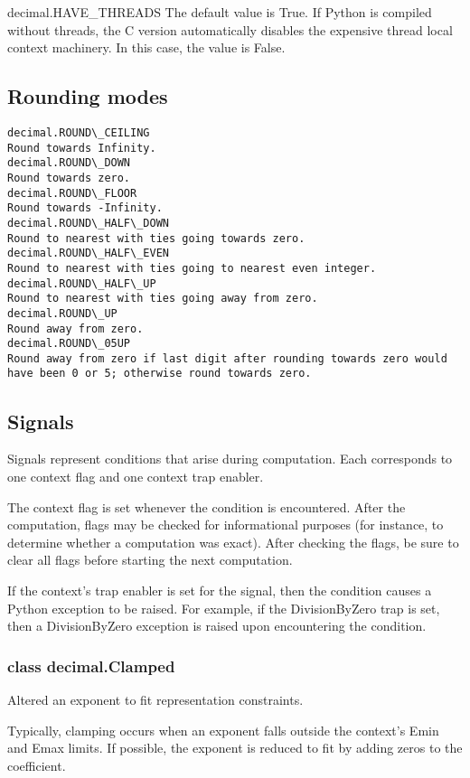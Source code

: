 decimal.HAVE\_THREADS
The default value is True. If Python is compiled without threads, the C version automatically disables the expensive thread local context machinery. In this case, the value is False.

\subsection{Rounding modes}

\begin{lstlisting}
decimal.ROUND\_CEILING
Round towards Infinity.
decimal.ROUND\_DOWN
Round towards zero.
decimal.ROUND\_FLOOR
Round towards -Infinity.
decimal.ROUND\_HALF\_DOWN
Round to nearest with ties going towards zero.
decimal.ROUND\_HALF\_EVEN
Round to nearest with ties going to nearest even integer.
decimal.ROUND\_HALF\_UP
Round to nearest with ties going away from zero.
decimal.ROUND\_UP
Round away from zero.
decimal.ROUND\_05UP
Round away from zero if last digit after rounding towards zero would have been 0 or 5; otherwise round towards zero.
\end{lstlisting}


\subsection{Signals}

Signals represent conditions that arise during computation. Each corresponds to one context flag and one context trap enabler.

\vpara
The context flag is set whenever the condition is encountered. After the computation, flags may be checked for informational purposes (for instance, to determine whether a computation was exact). After checking the flags, be sure to clear all flags before starting the next computation.

\vpara
If the context's trap enabler is set for the signal, then the condition causes a Python exception to be raised. For example, if the DivisionByZero trap is set, then a DivisionByZero exception is raised upon encountering the condition.

\subsubsection{class decimal.Clamped}

Altered an exponent to fit representation constraints.

Typically, clamping occurs when an exponent falls outside the context’s Emin and Emax limits. If possible, the exponent is reduced to fit by adding zeros to the coefficient.

